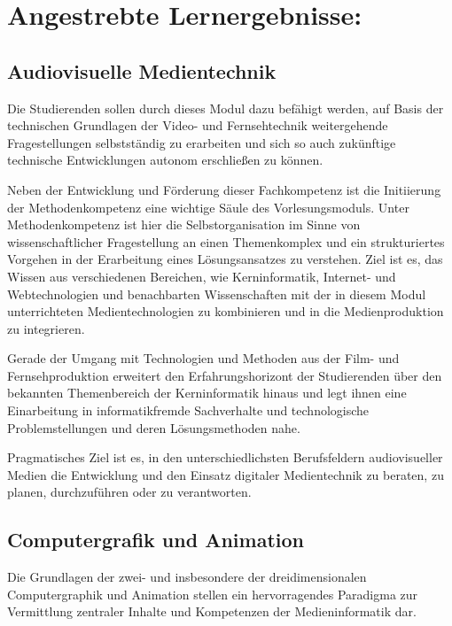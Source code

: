 \section*{Angestrebte
Lernergebnisse:}\label{angestrebte-lernergebnisse-29}

\subsection*{Audiovisuelle
Medientechnik}\label{audiovisuelle-medientechnik}

Die Studierenden sollen durch dieses Modul dazu befähigt werden, auf
Basis der technischen Grundlagen der Video- und Fernsehtechnik
weitergehende Fragestellungen selbstständig zu erarbeiten und sich so
auch zukünftige technische Entwicklungen autonom erschließen zu können.

Neben der Entwicklung und Förderung dieser Fachkompetenz ist die
Initiierung der Methodenkompetenz eine wichtige Säule des
Vorlesungsmoduls. Unter Methodenkompetenz ist hier die
Selbstorganisation im Sinne von wissenschaftlicher Fragestellung an
einen Themenkomplex und ein strukturiertes Vorgehen in der Erarbeitung
eines Lösungsansatzes zu verstehen. Ziel ist es, das Wissen aus
verschiedenen Bereichen, wie Kerninformatik, Internet- und
Webtechnologien und benachbarten Wissenschaften mit der in diesem Modul
unterrichteten Medientechnologien zu kombinieren und in die
Medienproduktion zu integrieren.

Gerade der Umgang mit Technologien und Methoden aus der Film- und
Fernsehproduktion erweitert den Erfahrungshorizont der Studierenden über
den bekannten Themenbereich der Kerninformatik hinaus und legt ihnen
eine Einarbeitung in informatikfremde Sachverhalte und technologische
Problemstellungen und deren Lösungsmethoden nahe.

Pragmatisches Ziel ist es, in den unterschiedlichsten Berufsfeldern
audiovisueller Medien die Entwicklung und den Einsatz digitaler
Medientechnik zu beraten, zu planen, durchzuführen oder zu verantworten.

\subsection*{Computergrafik und
Animation}\label{computergrafik-und-animation}

Die Grundlagen der zwei- und insbesondere der dreidimensionalen
Computergraphik und Animation stellen ein hervorragendes Paradigma zur
Vermittlung zentraler Inhalte und Kompetenzen der Medieninformatik dar.

